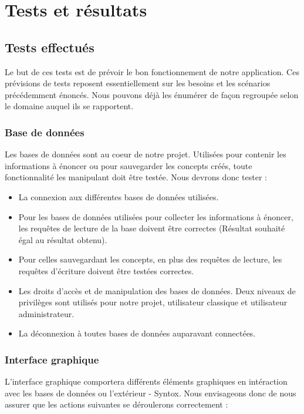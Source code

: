 \documentclass[12pt]{report}
\begin{document}
\chapter{Tests et résultats}

\section{Tests effectués}

Le but de ces tests est de prévoir le bon fonctionnement de notre application. Ces prévisions de tests reposent essentiellement sur les besoins et les scénarios précédemment énoncés. Nous pouvons déjà les énumérer de façon regroupée selon le domaine auquel ils se rapportent.

\subsection{Base de données}

Les bases de données sont au coeur de notre projet. Utilisées pour contenir les informations à énoncer ou pour sauvegarder les concepts créés, toute fonctionnalité les manipulant doit être testée.
Nous devrons donc tester :
	\begin{itemize}
	\item La connexion aux différentes bases de données utilisées. 
	\item Pour les bases de données utilisées pour collecter les informations à énoncer, les requêtes de lecture de la base doivent être correctes (Résultat souhaité égal au résultat obtenu).
	\item Pour celles sauvegardant les concepts, en plus des requêtes de lecture, les requêtes d'écriture doivent être testées correctes. 
	\item Les droits d'accès et de manipulation des bases de données. Deux niveaux de privilèges sont utilisés pour notre projet, utilisateur classique et utilisateur administrateur. 
	\item La déconnexion à toutes bases de données auparavant connectées.

	\end{itemize}
	
\subsection{Interface graphique}

L'interface graphique comportera différents éléments graphiques en intéraction avec les bases de données ou l'extérieur - Syntox. Nous envisageons donc de nous assurer que les actions suivantes se déroulerons correctement :
\end{document}
